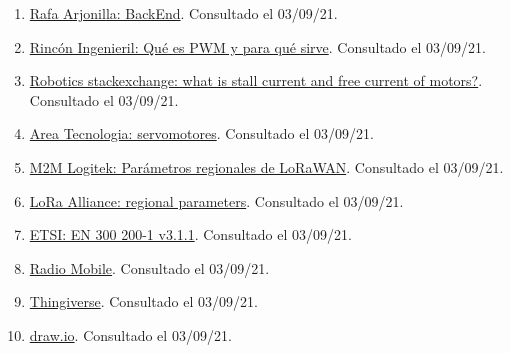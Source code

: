 \documentclass[12pt]{article}
\begin{document}
\begin{enumerate}
			\item
			\label{bib: backend}
			\href{https://rafarjonilla.com/que-es/backend/}{Rafa Arjonilla: BackEnd}. Consultado el 03/09/21.
			
			\item
			\label{bib: pwm}
			\href{https://www.rinconingenieril.es/que-es-pwm-y-para-que-sirve/}{Rincón Ingenieril: Qué es PWM y para qué sirve}. Consultado el 03/09/21.
			
			\item
			\label{robotics stall and free current}
			\href{https://robotics.stackexchange.com/questions/613/wha; t-is-stall-current-and-free-current-of-motors}{Robotics stackexchange: what is stall current and free current of motors?}. Consultado el 03/09/21.
			
			\item
			\label{areatecnologia: servomotores}
			\href{https://www.areatecnologia.com/electricidad/servomotor.html}{Area Tecnologia: servomotores}. Consultado el 03/09/21.
			
			\item
			\label{param regionales lorawan}
			\href{https://www.m2mlogitek.com/parametros-regionales-de-lorawan/}{M2M Logitek: Parámetros regionales de LoRaWAN}. Consultado el 03/09/21.
			
			\item
			\label{lora regional parameters}
			\href{https://lora-alliance.org/resource_hub/rp2-1-0-3-lorawan-regional-parameters/}{LoRa Alliance: regional parameters}. Consultado el 03/09/21.
			
			\item
			\label{etsi}
			\href{https://www.etsi.org/deliver/etsi_en/300200_300299/30022001/03.01.01_60/en_30022001v030101p.pdf}{ETSI: EN 300 200-1 v3.1.1}. Consultado el 03/09/21.
			
			\item
			\label{radio mobile web}
			\href{https://www.ve2dbe.com/english1.html}{Radio Mobile}. Consultado el 03/09/21.
			
			\item
			\label{thingiverse web}
			\href{https://www.thingiverse.com/}{Thingiverse}. Consultado el 03/09/21.
			
			\item
			\label{draw.io web}
			\href{https://app.diagrams.net/}{draw.io}. Consultado el 03/09/21.
			

\end{enumerate}
\end{document}
